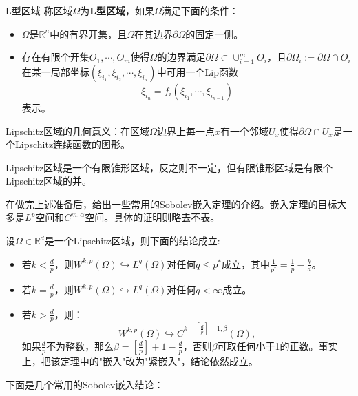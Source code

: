 \begin{definition}{L型区域}
    称区域$\Omega$为\textbf{L型区域}，如果$\Omega$满足下面的条件：
    \begin{itemize}
        \item $\Omega$是$\mathbb{R}^{n}$中的有界开集，且$\Omega$在其边界$\partial\Omega$的固定一侧。
        \item 存在有限个开集$O_{1},\cdots,O_{m}$使得$\Omega$的边界满足$\partial\Omega\subset\cup_{i=1}^{m}O_{i}$，且$\partial\Omega_{i}:=\partial\Omega\cap O_{i}$在某一局部坐标$(\xi_{i_1},\xi_{i_2},\cdots,\xi_{i_n})$中可用一个Lip函数
        \begin{equation}
            \xi_{i_n}=f_{i}(\xi_{i_1},\cdots,\xi_{i_{n-1}})
        \end{equation}
        表示。
    \end{itemize}
\end{definition}
\begin{remark}
    Lipschitz区域的几何意义：在区域$\Omega$边界上每一点$x$有一个邻域$U_{x}$使得$\partial\Omega\cap U_{x}$是一个Lipschitz连续函数的图形。
\end{remark}
\begin{remark}
    Lipschitz区域是一个有限锥形区域，反之则不一定，但有限锥形区域是有限个Lipschitz区域的并。
\end{remark}
在做完上述准备后，给出一些常用的Sobolev嵌入定理的介绍。嵌入定理的目标大多是$L^{p}$空间和$C^{m,\alpha}$空间。具体的证明则略去不表。
\begin{theorem}
    设$\Omega\in\mathbb{R}^{d}$是一个Lipschitz区域，则下面的结论成立:
    \begin{itemize}
        \item 若$k<\frac{d}{p}$，则$W^{k,p}(\Omega)\hookrightarrow L^{q}(\Omega)$对任何$q\le p^{*}$成立，其中$\frac{1}{p^{*}}=\frac{1}{p}-\frac{k}{d}$。
        \item 若$k=\frac{d}{p}$，则$W^{k,p}(\Omega)\hookrightarrow L^{q}(\Omega)$对任何$q<\infty$成立。
        \item 若$k>\frac{d}{p}$，则：
        \begin{equation}
            W^{k,p}(\Omega)\hookrightarrow C^{k-[\frac{d}{p}]-1,\beta}(\Omega),
        \end{equation}
        如果$\frac{d}{p}$不为整数，那么$\beta=[\frac{d}{p}]+1-\frac{d}{p}$，否则$\beta$可取任何小于1的正数。事实上，把该定理中的"嵌入"改为"紧嵌入"，结论依然成立。
    \end{itemize}
\end{theorem}
下面是几个常用的Sobolev嵌入结论：
